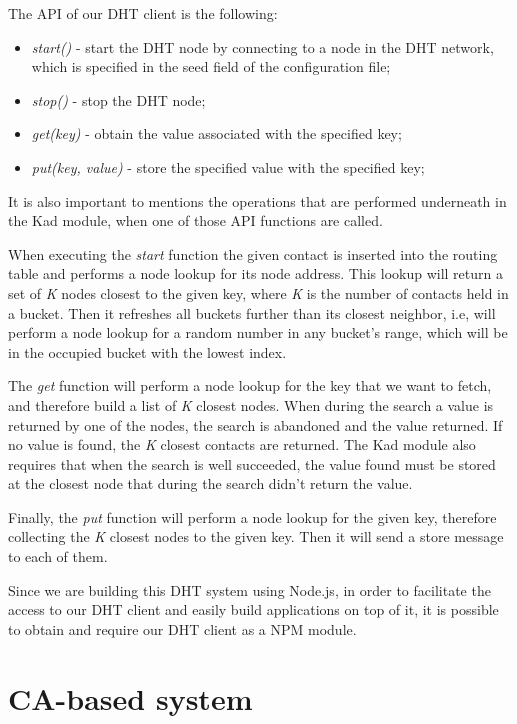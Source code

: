 The \ac{API} of our DHT client is the following:

\begin{itemize}
  \item \textit{start()} - start the DHT node by connecting to a node in the DHT network, which is specified in the seed field of the configuration file;
  \item \textit{stop()} - stop the DHT node;
  \item \textit{get(key)} - obtain the value associated with the specified key;
  \item \textit{put(key, value)} - store the specified value with the specified key;
\end{itemize}

It is also important to mentions the operations that are performed underneath in the Kad module, when one of those API functions are called.

When executing the \textit{start} function the given contact is inserted into the routing table and performs a node lookup for its node address.
This lookup will return a set of \textit{K} nodes closest to the given key, where \textit{K} is the number of contacts held in a bucket.
Then it refreshes all buckets further than its closest neighbor, i.e, will perform a node lookup for a random number in any bucket's range, which will be in the occupied bucket with the lowest index.

The \textit{get} function will perform a node lookup for the key that we want to fetch, and therefore build a list of \textit{K} closest nodes.
When during the search a value is returned by one of the nodes, the search is abandoned and the value returned.
If no value is found,  the \textit{K} closest contacts are returned.
The Kad module also requires that when the search is well succeeded, the value found must be stored at the closest node that during the search didn't return the value.

Finally, the \textit{put} function will perform a node lookup for the given key, therefore collecting the \textit{K} closest nodes to the given key.
Then it will send a store message to each of them.

Since we are building this DHT system using Node.js, in order to facilitate the access to our DHT client and easily build applications on top of it, it is possible to obtain and require our DHT client as a \ac{NPM} module.

\section{CA-based system}\label{implementation:ca-based}

